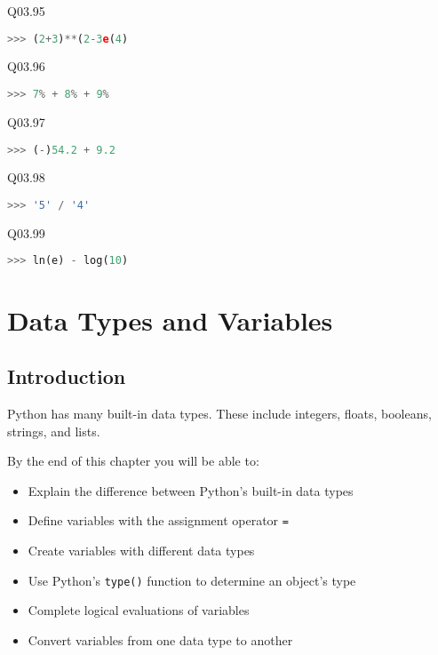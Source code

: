 \documentclass{book}
\newcommand{\passthrough}[1]{#1}
\begin{document}
Q03.95

\begin{lstlisting}[language=Python]
>>> (2+3)**(2-3e(4)
\end{lstlisting}

Q03.96

\begin{lstlisting}[language=Python]
>>> 7% + 8% + 9%
\end{lstlisting}

Q03.97

\begin{lstlisting}[language=Python]
>>> (-)54.2 + 9.2
\end{lstlisting}

Q03.98

\begin{lstlisting}[language=Python]
>>> '5' / '4'
\end{lstlisting}

Q03.99

\begin{lstlisting}[language=Python]
>>> ln(e) - log(10)
\end{lstlisting}
    




    
        \hypertarget{data-types-and-variables}{%
\chapter{Data Types and Variables}\label{data-types-and-variables}}
    




    
        \hypertarget{introduction}{%
\section{Introduction}\label{introduction}}
        \newpage

    




    
        Python has many built-in data types. These include integers, floats,
booleans, strings, and lists.

By the end of this chapter you will be able to:

\begin{itemize}
\item
  Explain the difference between Python's built-in data types
\item
  Define variables with the assignment operator
  \passthrough{\lstinline!=!}
\item
  Create variables with different data types
\item
  Use Python's \passthrough{\lstinline!type()!} function to determine an
  object's type
\item
  Complete logical evaluations of variables
\item
  Convert variables from one data type to another
\end{itemize}
        \newpage
\end{document}
